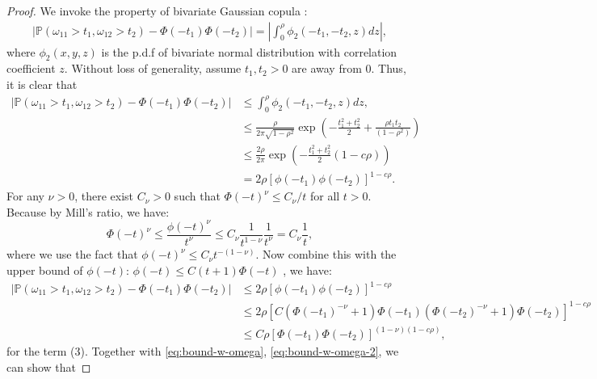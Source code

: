 \documentclass[12pt]{article}
\newcommand{\abs}[1]{\left\lvert#1\right\rvert}
\newcommand{\PP}{\mathbb{P}}
\def\PP{{\mathbb P}}
\theoremstyle{plain}
\begin{document}
\begin{proof}
We invoke the property of bivariate Gaussian copula \citep{meyer2013bivariate}:
\begin{equation*}
    \begin{aligned}
         \abs{\PP(\omega_{11} >t_1, \omega_{12}>t_2)-\Phi(-t_1)\Phi(-t_2) }=\abs{\int_{0}^{\rho} \phi_2(-t_1,-t_2,z ) dz},
    \end{aligned}
\end{equation*}
where $ \phi_2(x,y,z )$ is the p.d.f of bivariate normal distribution with correlation coefficient $z$. Without loss of generality, assume $t_1,t_2>0$ are away from $0$. Thus, it is clear that
\begin{equation*}
    \begin{aligned}
         \abs{\PP(\omega_{11} >t_1, \omega_{12}>t_2)-\Phi(-t_1)\Phi(-t_2) } &\le \int_{0}^{\rho } \phi_2(-t_1,-t_2,z ) dz, \\
         & \le \frac{\rho}{2 \pi \sqrt{1-\rho^2}} \exp \left(-\frac{t_1^2+t_2^2}{2}+\frac{\rho t_1 t_2}{\left(1-\rho^2\right)}\right) \\
         & \le \frac{2\rho}{2 \pi }  \exp \left(-\frac{t_1^2+t_2^2}{2}(1-c\rho)\right) \\
         & = 2\rho \left[\phi(-t_1)\phi(-t_2)\right]^{1-c\rho}.
    \end{aligned}
\end{equation*}
For any $\nu>0$, there exist $C_\nu>0$ such that $\Phi(-t)^\nu \le C_\nu/t $ for all $t>0$. Because by Mill's ratio, we have:
\begin{equation*}
    \Phi(-t)^\nu \le \frac{\phi (-t)^\nu}{t^\nu}\le C_\nu \frac{1}{t^{1-\nu}}\frac{1}{t^\nu}=C_\nu \frac{1}{t},
\end{equation*}
where we use the fact that $\phi (-t)^\nu\le C_\nu t^{-(1-\nu)} $. Now combine this with the upper bound of $\phi (-t)$: $\phi (-t)\le C (t+1)\Phi (-t) $ , we have:
\begin{equation}\label{eq:bound-w-omega-3}
    \begin{aligned}
         \abs{\PP(\omega_{11} >t_1, \omega_{12}>t_2)-\Phi(-t_1)\Phi(-t_2) } &\le 2\rho \left[\phi(-t_1)\phi(-t_2)\right]^{1-c\rho} \\
         & \le 2\rho\left[ C (\Phi(-t_1)^{-\nu}+1 )\Phi(-t_1) (\Phi(-t_2)^{-\nu}+1 )\Phi(-t_2) \right]^{1-c\rho} \\
         & \le C\rho \left[\Phi(-t_1)\Phi(-t_2)\right]^{(1-\nu)(1-c\rho) },
    \end{aligned}
\end{equation}
for the term (3). Together with \eqref{eq:bound-w-omega}, \eqref{eq:bound-w-omega-2}, we can show that

\end{proof}
\end{document}

